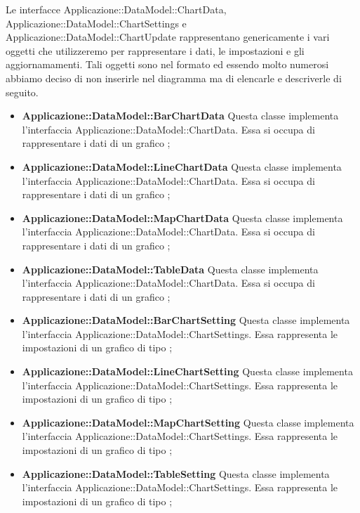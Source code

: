 	Le interfacce Applicazione::DataModel::ChartData, Applicazione::DataModel::ChartSettings e Applicazione::DataModel::ChartUpdate rappresentano genericamente i vari oggetti che utilizzeremo per rappresentare i dati, le impostazioni e gli aggiornamamenti. Tali oggetti sono nel formato  ed essendo molto numerosi abbiamo deciso di non inserirle nel diagramma ma di elencarle e descriverle di seguito.

	\begin{itemize}
		\item \textbf{Applicazione::DataModel::BarChartData} Questa classe implementa l'interfaccia Applicazione::DataModel::ChartData. Essa si occupa di rappresentare i dati di un grafico ;

		\item \textbf{Applicazione::DataModel::LineChartData} Questa classe implementa l'interfaccia Applicazione::DataModel::ChartData. Essa si occupa di rappresentare i dati di un grafico ;

		\item \textbf{Applicazione::DataModel::MapChartData} Questa classe implementa l'interfaccia Applicazione::DataModel::ChartData. Essa si occupa di rappresentare i dati di un grafico ;

		\item \textbf{Applicazione::DataModel::TableData} Questa classe implementa l'interfaccia Applicazione::DataModel::ChartData. Essa si occupa di rappresentare i dati di un grafico ;

		\item \textbf{Applicazione::DataModel::BarChartSetting} Questa classe implementa l'interfaccia Applicazione::DataModel::ChartSettings. Essa rappresenta le impostazioni di un grafico di tipo ;

		\item \textbf{Applicazione::DataModel::LineChartSetting} Questa classe implementa l'interfaccia Applicazione::DataModel::ChartSettings. Essa rappresenta le impostazioni di un grafico di tipo ;

		\item \textbf{Applicazione::DataModel::MapChartSetting} Questa classe implementa l'interfaccia Applicazione::DataModel::ChartSettings. Essa rappresenta le impostazioni di un grafico di tipo ;

		\item \textbf{Applicazione::DataModel::TableSetting} Questa classe implementa l'interfaccia Applicazione::DataModel::ChartSettings. Essa rappresenta le impostazioni di un grafico di tipo ;


\end{itemize}
